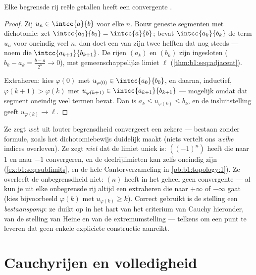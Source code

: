 \begin{theorem}\label{thm:b1:seq:bw}
Elke begrensde rij reële getallen heeft een convergente
.
\end{theorem}

\begin{proof}
Zij $u_n \in \intcc{a}{b}$ voor elke $n$. Bouw geneste segmenten met
dichotomie: zet $\intcc{a_0}{b_0} = \intcc{a}{b}$; bevat
$\intcc{a_k}{b_k}$ de term $u_n$ voor oneindig veel $n$, dan doet een van
zijn twee helften dat nog steeds --- noem die $\intcc{a_{k+1}}{b_{k+1}}$.
De rijen $(a_k)$ en $(b_k)$ zijn ingesloten ($b_k - a_k =
\frac{b-a}{2^k} \to 0$), met gemeenschappelijke limiet $\ell$
(\cref{thm:b1:seq:adjacent}).

Extraheren: kies $\varphi(0)$ met $u_{\varphi(0)} \in \intcc{a_0}{b_0}$,
en daarna, inductief, $\varphi(k+1) > \varphi(k)$ met $u_{\varphi(k+1)}
\in \intcc{a_{k+1}}{b_{k+1}}$ --- mogelijk omdat dat segment oneindig
veel termen bevat. Dan is $a_k \leq u_{\varphi(k)} \leq b_k$, en de
insluitstelling geeft $u_{\varphi(k)} \to \ell$.
\end{proof}

\begin{remark}
Ze zegt \emph{wel}: uit louter begrensdheid convergeert een zekere
 --- bestaan zonder formule, zoals het dichotomiebewijs duidelijk
maakt (niets vertelt ons \emph{welke} indices overleven). Ze zegt
\emph{niet} dat de limiet uniek is: $((-1)^n)$ heeft  die naar
$1$ en naar $-1$ convergeren, en de  deelrijlimieten kan zelfs
oneindig zijn (\cref{ex:b1:seq:sublimits}, en de hele Cantorverzameling
in \cref{pb:b1:topology:1}). Ze overleeft de onbegrensdheid niet: $(n)$
heeft in het geheel geen convergente  --- al kun je uit elke
onbegrensde rij altijd een  extraheren die naar $+\infty$ of
$-\infty$ gaat (kies bijvoorbeeld $\varphi(k)$ met $u_{\varphi(k)} \geq
k$). Correct gebruikt is de stelling een \emph{bestaanspomp}: ze duikt op
in het hart van het criterium van Cauchy hieronder, van de stelling van
Heine en van de extremumstelling --- telkens om een punt te leveren dat
geen enkele expliciete constructie aanreikt.
\end{remark}

\section{Cauchyrijen en volledigheid}

